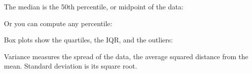 \documentclass[letterpaper,10pt,english]{sphinxmanual}
\begin{document}
\begin{sphinxVerbatim}[commandchars=\\\{\}]
 \PYG{p}{[}\PYG{p}{]} 
  
\end{sphinxVerbatim}

The median is the 50th percentile, or midpoint of the data:

\begin{sphinxVerbatim}[commandchars=\\\{\}]
 \PYG{p}{[}\PYG{p}{]} 
  
\end{sphinxVerbatim}

Or you can compute any percentile:

\begin{sphinxVerbatim}[commandchars=\\\{\}]
  
    \PYG{p}{[}\PYG{p}{]} \PYG{p}{[}    \PYG{p}{]} 
  \PYG{p}{[}\PYG{p}{]}  \PYG{p}{[}\PYG{p}{]}
\end{sphinxVerbatim}

Box plots show the quartiles, the IQR, and the outliers:

\begin{sphinxVerbatim}[commandchars=\\\{\}]
    
\end{sphinxVerbatim}

Variance measures the spread of the data, the average squared distance from the mean.
Standard deviation is its square root.
\end{document}

